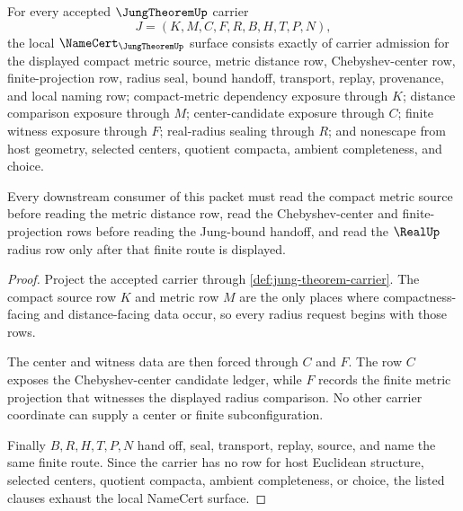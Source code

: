 \begin{theorem}
\label{thm:jung-theorem-namecert-obligations}
For every accepted $\JungTheoremUp$ carrier
$$
J=(K,M,C,F,R,B,H,T,P,N),
$$
the local $\NameCert_{\JungTheoremUp}$ surface consists exactly of carrier admission for the displayed compact metric source, metric distance row, Chebyshev-center row, finite-projection row, radius seal, bound handoff, transport, replay, provenance, and local naming row; compact-metric dependency exposure through $K$; distance comparison exposure through $M$; center-candidate exposure through $C$; finite witness exposure through $F$; real-radius sealing through $R$; and nonescape from host geometry, selected centers, quotient compacta, ambient completeness, and choice.

Every downstream consumer of this packet must read the compact metric source before reading the metric distance row, read the Chebyshev-center and finite-projection rows before reading the Jung-bound handoff, and read the $\RealUp$ radius row only after that finite route is displayed.
\end{theorem}
\begin{proof}
Project the accepted carrier through \autoref{def:jung-theorem-carrier}. The compact source row $K$ and metric row $M$ are the only places where compactness-facing and distance-facing data occur, so every radius request begins with those rows.

The center and witness data are then forced through $C$ and $F$. The row $C$ exposes the Chebyshev-center candidate ledger, while $F$ records the finite metric projection that witnesses the displayed radius comparison. No other carrier coordinate can supply a center or finite subconfiguration.

Finally $B,R,H,T,P,N$ hand off, seal, transport, replay, source, and name the same finite route. Since the carrier has no row for host Euclidean structure, selected centers, quotient compacta, ambient completeness, or choice, the listed clauses exhaust the local NameCert surface.
\end{proof}

